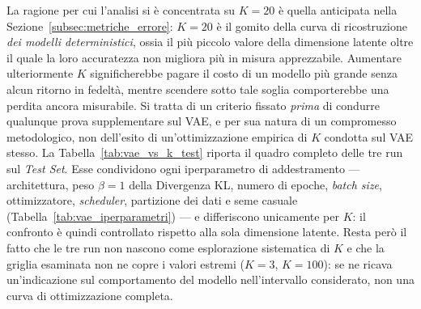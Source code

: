 La ragione per cui l'analisi si è concentrata su $K=20$ è quella anticipata nella Sezione~\ref{subsec:metriche_errore}: $K=20$ è il gomito della curva di ricostruzione \emph{dei modelli deterministici}, ossia il più piccolo valore della dimensione latente oltre il quale la loro accuratezza non migliora più in misura apprezzabile. Aumentare ulteriormente $K$ significherebbe pagare il costo di un modello più grande senza alcun ritorno in fedeltà, mentre scendere sotto tale soglia comporterebbe una perdita ancora misurabile. Si tratta di un criterio fissato \emph{prima} di condurre qualunque prova supplementare sul VAE, e per sua natura di un compromesso metodologico, non dell'esito di un'ottimizzazione empirica di $K$ condotta sul VAE stesso. La Tabella~\ref{tab:vae_vs_k_test} riporta il quadro completo delle tre run sul \emph{Test Set}. Esse condividono ogni iperparametro di addestramento --- architettura, peso $\beta = 1$ della Divergenza KL, numero di epoche, \emph{batch size}, ottimizzatore, \emph{scheduler}, partizione dei dati e seme casuale (Tabella~\ref{tab:vae_iperparametri}) --- e differiscono unicamente per $K$: il confronto è quindi controllato rispetto alla sola dimensione latente. Resta però il fatto che le tre run non nascono come esplorazione sistematica di $K$ e che la griglia esaminata non ne copre i valori estremi ($K=3$, $K=100$): se ne ricava un'indicazione sul comportamento del modello nell'intervallo considerato, non una curva di ottimizzazione completa.

